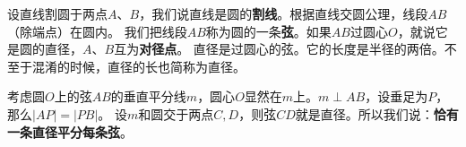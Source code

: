 \documentclass[12pt,UTF8,fontset=none]{ctexbook}
\begin{document}
设直线割圆于两点$A$、$B$，我们说直线是圆的\textbf{割线}。根据直线交圆公理，线段$AB$（除端点）在圆内。
我们把线段$AB$称为圆的一条\textbf{弦}。如果$AB$过圆心$O$，就说它是圆的直径，$A$、$B$互为\textbf{对径点}。
直径是过圆心的弦。它的长度是半径的两倍。不至于混淆的时候，直径的长也简称为直径。

考虑圆$O$上的弦$AB$的垂直平分线$m$，圆心$O$显然在$m$上。$m \perp AB$，设垂足为$P$，那么$|AP| = |PB|$。
设$m$和圆交于两点$C,D$，则弦$CD$就是直径。所以我们说：\textbf{恰有一条直径平分每条弦}。




\end{document}
